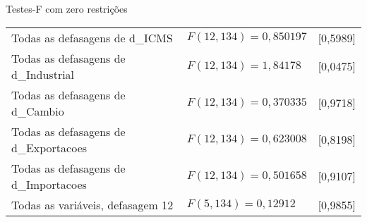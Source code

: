 \documentclass[11pt]{article}
\begin{document}
\begin{center}
Testes-F com zero restrições\\[1em]
\begin{tabular}{lll}
Todas as defasagens de d\_ICMS & $F(12, 134) = 0,850197$ & [0,5989]\\
Todas as defasagens de d\_Industrial & $F(12, 134) = 1,84178$ & [0,0475]\\
Todas as defasagens de d\_Cambio & $F(12, 134) = 0,370335$ & [0,9718]\\
Todas as defasagens de d\_Exportacoes & $F(12, 134) = 0,623008$ & [0,8198]\\
Todas as defasagens de d\_Importacoes & $F(12, 134) = 0,501658$ & [0,9107]\\
Todas as variáveis, defasagem 12 & $F(5, 134) = 0,12912$ & [0,9855]\\
\end{tabular}
\end{center}

\clearpage
\end{document}
